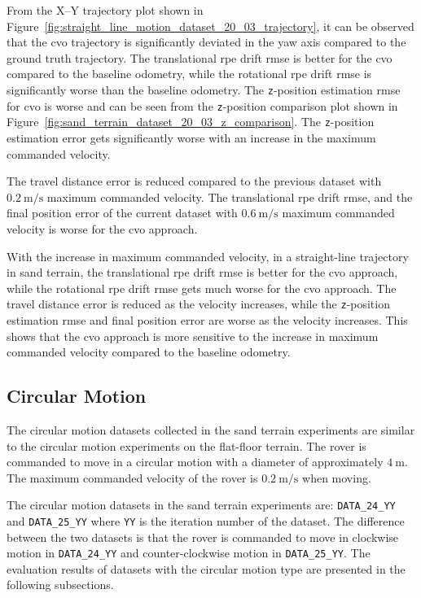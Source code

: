\documentclass[report.tex]{subfiles}
\begin{document}
    
    From the X--Y trajectory plot shown in Figure~\ref{fig:straight_line_motion_dataset_20_03_trajectory}, it can be observed that the \gls{cvo} trajectory is significantly deviated in the yaw axis compared to the ground truth trajectory. The translational \gls{rpe} drift \gls{rmse} is better for the \gls{cvo} compared to the baseline odometry, while the rotational \gls{rpe} drift \gls{rmse} is significantly worse than the baseline odometry. The \texttt{z}-position estimation \gls{rmse} for \gls{cvo} is worse and can be seen from the \texttt{z}-position comparison plot shown in Figure~\ref{fig:sand_terrain_dataset_20_03_z_comparison}. The \texttt{z}-position estimation error gets significantly worse with an increase in the maximum commanded velocity. 
    
    The travel distance error is reduced compared to the previous dataset with $0.2~\mathrm{m/s}$ maximum commanded velocity. The translational \gls{rpe} drift \gls{rmse}, and the final position error of the current dataset with $0.6~\mathrm{m/s}$ maximum commanded velocity is worse for the \gls{cvo} approach. 
    
    With the increase in maximum commanded velocity, in a straight-line trajectory in sand terrain, the translational \gls{rpe} drift \gls{rmse} is better for the \gls{cvo} approach, while the rotational \gls{rpe} drift \gls{rmse} gets much worse for the \gls{cvo} approach. The travel distance error is reduced as the velocity increases, while the \texttt{z}-position estimation \gls{rmse} and final position error are worse as the velocity increases. This shows that the \gls{cvo} approach is more sensitive to the increase in maximum commanded velocity compared to the baseline odometry.
    \FloatBarrier
    
    \subsection{Circular Motion}
    
    The circular motion datasets collected in the sand terrain experiments are similar to the circular motion experiments on the flat-floor terrain. The rover is commanded to move in a circular motion with a diameter of approximately $4~\mathrm{m}$. The maximum commanded velocity of the rover is $0.2~\mathrm{m/s}$ when moving. 
    
    The circular motion datasets in the sand terrain experiments are: \texttt{DATA\_24\_YY} and \texttt{DATA\_25\_YY} where \texttt{YY} is the iteration number of the dataset. The difference between the two datasets is that the rover is commanded to move in clockwise motion in \texttt{DATA\_24\_YY} and counter-clockwise motion in \texttt{DATA\_25\_YY}. The evaluation results of datasets with the circular motion type are presented in the following subsections. 
    
\end{document}
